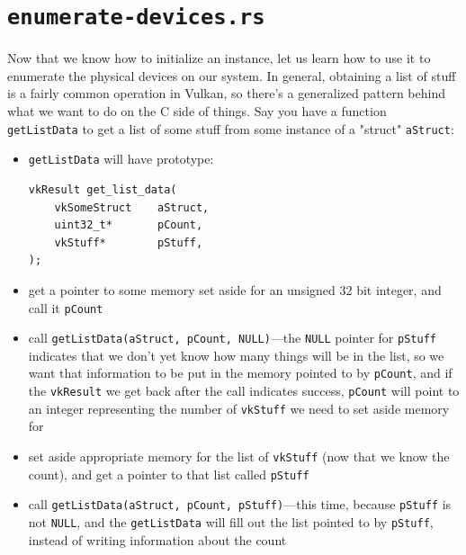 \documentclass[12pt,letterpaper]{article}
\newcommand{\cil}[1]{\texttt{#1}}
\begin{document}
\section{\texttt{enumerate-devices.rs}}
	Now that we know how to initialize an instance, let us learn how to use it to enumerate the physical devices on our system. In general, obtaining a list of stuff is a fairly common operation in Vulkan, so there's a generalized pattern behind what we want to do on the C side of things. Say you have a function \cil{getListData} to get a list of some stuff from some instance of a "struct" \cil{aStruct}:
		\begin{itemize}
			\item \cil{getListData} will have prototype:
				\begin{verbatim}
vkResult get_list_data(
	vkSomeStruct 	aStruct,
	uint32_t*		pCount,
	vkStuff*		pStuff,	
);
				\end{verbatim}
			\item get a pointer to some memory set aside for an unsigned 32 bit integer, and call it \cil{pCount}
			
			\item call \cil{getListData(aStruct, pCount, NULL)}---the \cil{NULL} pointer for \cil{pStuff} indicates that we don't yet know how many things will be in the list, so we want that information to be put in the memory pointed to by \cil{pCount}, and if the \cil{vkResult} we get back after the call indicates success, \cil{pCount} will point to an integer representing the number of \cil{vkStuff} we need to set aside memory for
			
			\item set aside appropriate memory for the list of \cil{vkStuff} (now that we know the count), and get a pointer to that list called \cil{pStuff}
			
			\item call \cil{getListData(aStruct, pCount, pStuff)}---this time, because \cil{pStuff} is not \cil{NULL}, and the \cil{getListData} will fill out the list pointed to by \cil{pStuff}, instead of writing information about the count
		\end{itemize}
\end{document}
